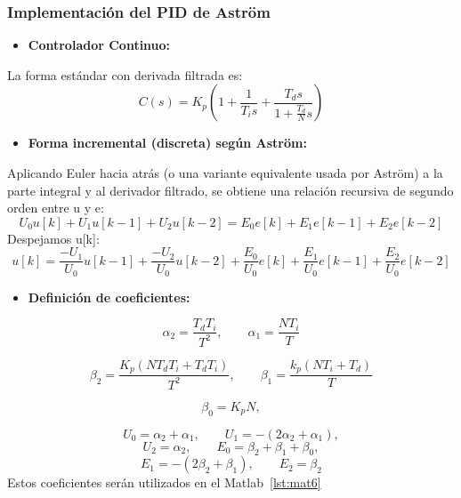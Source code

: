 \subsubsection{Implementación del PID de Astr\"om}
\begin{itemize}
	\item \textbf{Controlador Continuo:}
\end{itemize}


La forma estándar con derivada filtrada es:
\begin{equation}
	C(s)=K_p(1+\frac{1}{T_is}+\frac{T_ds}{1+\frac{T_d}{N}s})
\end{equation}
\begin{itemize}
	\item \textbf{Forma incremental (discreta) según Astr\"om:}
\end{itemize}
Aplicando Euler hacia atrás (o una variante equivalente usada por Astr\"om) a la parte integral y al derivador filtrado, se obtiene una relación recursiva de segundo orden entre u y e:
\[
	U_0u[k]+U_1u[k-1]+U_2u[k-2]=E_0e[k]+E_1e[k-1]+E_2e[k-2]
\]
Despejamos u[k]:
\begin{equation}
	u[k]=\frac{-U_1}{U_0}u[k-1]+\frac{-U_2}{U_0}u[k-2]+\frac{E_0}{U_0}e[k]+\frac{E_1}{U_0}e[k-1]+\frac{E_2}{U_0}e[k-2]
\end{equation}
\begin{itemize}
	\item \textbf{Definición de coeficientes:}
\end{itemize}
\[
	\alpha_2=\frac{T_dT_i}{T^2},	\qquad	\alpha_1=\frac{NT_i}{T}
\]

\[
	\beta_2=\frac{K_p(NT_dT_i+T_dT_i)}{T^2}, \qquad \beta_1=\frac{k_p(NT_i+T_d)}{T}
\]

\[
	\beta_0=K_pN,
\]

\[
	U_0=\alpha_2+\alpha_1, \qquad U_1=-(2\alpha_2+\alpha_1),
\]
\[
	U_2=\alpha_2, \qquad E_0=\beta_2+\beta_1+\beta_0,
\]
\[
	E_1=-(2\beta_2+\beta_1), \qquad E_2=\beta_2
\]
Estos coeficientes serán utilizados en el Matlab~\ref{lst:mat6}
\onecolumn

